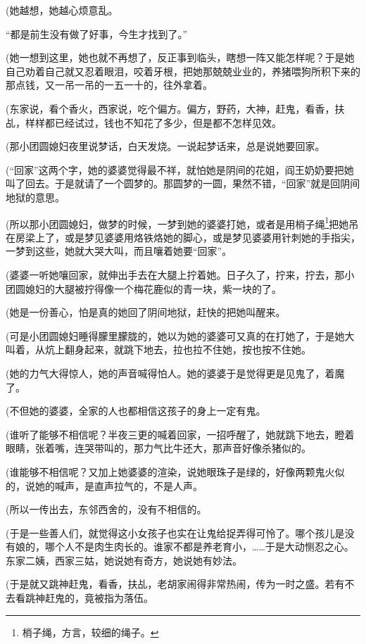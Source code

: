 \par (她越想，她越心烦意乱。
\par “都是前生没有做了好事，今生才找到了。”
\par (她一想到这里，她也就不再想了，反正事到临头，瞎想一阵又能怎样呢？于是她自己劝着自己就又忍着眼泪，咬着牙根，把她那兢兢业业的，养猪喂狗所积下来的那点钱，又一吊一吊的一五一十的，往外拿着。
\par (东家说，看个香火，西家说，吃个偏方。偏方，野药，大神，赶鬼，看香，扶乩，样样都已经试过，钱也不知花了多少，但是都不怎样见效。
\par (那小团圆媳妇夜里说梦话，白天发烧。一说起梦话来，总是说她要回家。
\par (“回家”这两个字，她的婆婆觉得最不祥，就怕她是阴间的花姐，阎王奶奶要把她叫了回去。于是就请了一个圆梦的。那圆梦的一圆，果然不错，“回家”就是回阴间地狱的意思。
\par (所以那小团圆媳妇，做梦的时候，一梦到她的婆婆打她，或者是用梢子绳\footnote{梢子绳，方言，较细的绳子。}把她吊在房梁上了，或是梦见婆婆用烙铁烙她的脚心，或是梦见婆婆用针刺她的手指尖，一梦到这些，她就大哭大叫，而且嚷着她要“回家”。
\par (婆婆一听她嚷回家，就伸出手去在大腿上拧着她。日子久了，拧来，拧去，那小团圆媳妇的大腿被拧得像一个梅花鹿似的青一块，紫一块的了。
\par (她是一份善心，怕是真的她回了阴间地狱，赶快的把她叫醒来。
\par (可是小团圆媳妇睡得朦里朦胧的，她以为她的婆婆可又真的在打她了，于是她大叫着，从炕上翻身起来，就跳下地去，拉也拉不住她，按也按不住她。
\par (她的力气大得惊人，她的声音喊得怕人。她的婆婆于是觉得更是见鬼了，着魔了。
\par (不但她的婆婆，全家的人也都相信这孩子的身上一定有鬼。
\par (谁听了能够不相信呢？半夜三更的喊着回家，一招呼醒了，她就跳下地去，瞪着眼睛，张着嘴，连哭带叫的，那力气比牛还大，那声音好像杀猪似的。
\par (谁能够不相信呢？又加上她婆婆的渲染，说她眼珠子是绿的，好像两颗鬼火似的，说她的喊声，是直声拉气的，不是人声。
\par (所以一传出去，东邻西舍的，没有不相信的。
\par (于是一些善人们，就觉得这小女孩子也实在让鬼给捉弄得可怜了。哪个孩儿是没有娘的，哪个人不是肉生肉长的。谁家不都是养老育小，……于是大动恻忍之心。东家二姨，西家三姑，她说她有奇方，她说她有妙法。
\par (于是就又跳神赶鬼，看香，扶乩，老胡家闹得非常热闹，传为一时之盛。若有不去看跳神赶鬼的，竟被指为落伍。

